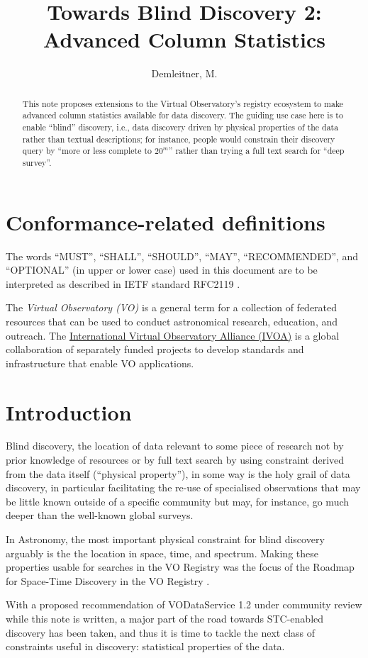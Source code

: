 \documentclass[11pt,a4paper]{ivoa}
\title{Towards Blind Discovery 2: Advanced Column Statistics}
\author[https://wiki.ivoa.net/twiki/bin/view/IVOA/MarkusDemleitner]{Demleitner, M.}
\begin{document}
\begin{abstract}
This note proposes extensions to the Virtual Observatory's registry
ecosystem to make advanced column statistics available for data
discovery.  The guiding use case here is to enable ``blind'' discovery,
i.e., data discovery driven by physical properties of the data rather
than textual descriptions; for instance, people would constrain their
discovery query by ``more or less complete to $20^m$'' rather than
trying a full text search for ``deep survey''.
\end{abstract}


\section*{Conformance-related definitions}

The words ``MUST'', ``SHALL'', ``SHOULD'', ``MAY'', ``RECOMMENDED'', and
``OPTIONAL'' (in upper or lower case) used in this document are to be
interpreted as described in IETF standard RFC2119 \citep{std:RFC2119}.

The \emph{Virtual Observatory (VO)} is a
general term for a collection of federated resources that can be used
to conduct astronomical research, education, and outreach.
The \href{http://www.ivoa.net}{International
Virtual Observatory Alliance (IVOA)} is a global
collaboration of separately funded projects to develop standards and
infrastructure that enable VO applications.


\section{Introduction}

Blind discovery, the location of data relevant to some piece of research
not by prior knowledge of resources or by full text search by using
constraint derived from the data itself (``physical property''), in some
way is the holy grail of data discovery, in particular facilitating the
re-use of specialised observations that may be little known outside of a
specific community but may, for instance, go much deeper than the
well-known global surveys.

In Astronomy, the most important physical constraint for blind discovery
arguably is the the location in space, time, and spectrum.  Making these
properties usable for searches in the VO Registry was the focus of the
Roadmap for Space-Time Discovery in the VO Registry \citep{std:srcReg}.

With a proposed recommendation of VODataService 1.2 \citep{pr:VODS12}
under community review while this note is written, a major part of the
road towards STC-enabled discovery has been taken, and thus it is time
to tackle the next class of constraints useful in discovery: statistical
properties of the data.
\end{document}
